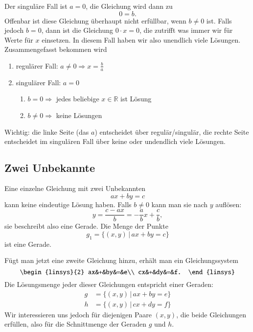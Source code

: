 Der singuläre Fall ist $a=0$, die Gleichung wird dann zu 
\[
0=b.
\]
Offenbar ist diese Gleichung überhaupt nicht erfüllbar, wenn $b\ne 0$
ist.
Falls jedoch $b=0$, dann ist die Gleichung $0\cdot x=0$, die
zutrifft was immer wir für Werte für $x$ einsetzen.
In diesem Fall haben wir also unendlich viele Lösungen.
Zusammengefasst
bekommen wird
\begin{enumerate}
\item regulärer Fall: $a\ne 0\Rightarrow x=\frac{b}{a}$
\item singulärer Fall: $a=0$
\begin{enumerate}
\item $b=0\Rightarrow$ jedes beliebige $x\in\mathbb R$ ist Lösung
\item $b\ne0\Rightarrow$ keine Lösungen
\end{enumerate}
\end{enumerate}
Wichtig: die linke Seite (das $a$) entscheidet über regulär/singulär,
die rechte Seite entscheidet im singulären Fall über keine oder
undendlich viele Lösungen.

\subsection{Zwei Unbekannte}
Eine einzelne Gleichung mit zwei Unbekannten 
\[
ax+by=c
\]
kann keine eindeutige Lösung haben.
Falls $b\ne 0$ kann man
sie nach $y$ auflösen:
\[
y=\frac{c-ax}b=-\frac{a}{b}x+\frac{c}b,
\]
sie beschreibt also eine Gerade.
Die Menge der Punkte 
\[
g_1=\{(x,y)\,|\,ax+by=c\}
\]
ist eine Gerade.

Fügt man jetzt eine zweite Gleichung hinzu, erhält man
ein Gleichungssystem
\[
\begin{linsys}{2}
ax&+&by&=&e\\
cx&+&dy&=&f.
\end{linsys}
\]
Die Lösungsmenge jeder dieser Gleichungen entspricht einer
Geraden:
\begin{align*}
g&=\{(x,y)\,|\,ax+by=e\}\\
h&=\{(x,y)\,|\,cx+dy=f\}
\end{align*}
Wir interessieren uns jedoch für diejenigen Paare $(x,y)$,
die beide Gleichungen erfüllen, also für die Schnittmenge
der Geraden $g$ und $h$.

